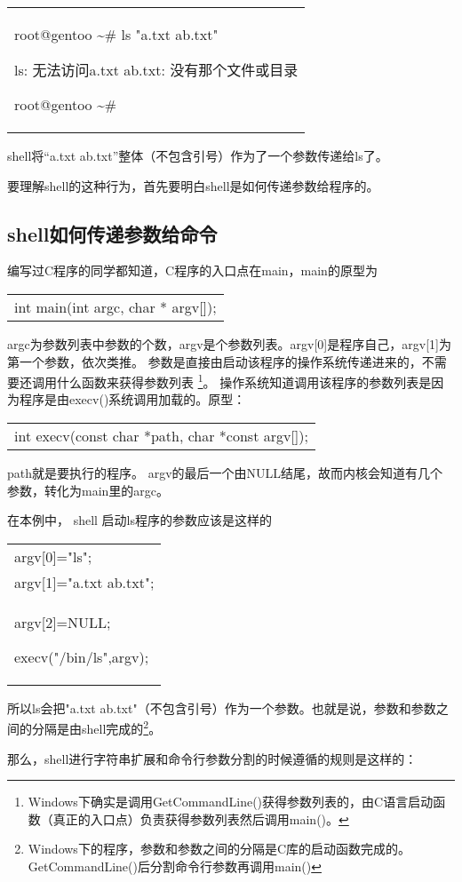 \documentclass[amstex,twoside]{ctexbook}
\newenvironment{insertnote}{ \ttfamily\CJKfamily{KaiTi} }{\vskip 0.5cm }
\newenvironment{code}{\small\tt\begin{longtable}{p{0.8\textwidth}}}{\end{longtable}}
\begin{document}
\begin{code}
root@gentoo \textasciitilde \# ls "a.txt ab.txt" 

ls: 无法访问a.txt ab.txt: 没有那个文件或目录 

root@gentoo \textasciitilde \# 
\end{code}

shell将“a.txt ab.txt”整体（不包含引号）作为了一个参数传递给ls了。

要理解shell的这种行为，首先要明白shell是如何传递参数给程序的。

\begin{insertnote}
\subsection*{shell如何传递参数给命令}

编写过C程序的同学都知道，C程序的入口点在main，main的原型为

\begin{code}
int main(int argc, char * argv[]);
\end{code}

argc为参数列表中参数的个数，argv是个参数列表。argv[0]是程序自己，argv[1]为第一个参数，依次类推。
参数是直接由启动该程序的操作系统传递进来的，不需要还调用什么函数来获得参数列表
\footnote{Windows下确实是调用GetCommandLine()获得参数列表的，由C语言启动函数（真正的入口点）负责获得参数列表然后调用main()。}。
操作系统知道调用该程序的参数列表是因为程序是由execv()系统调用加载的。原型：
\begin{code}
int execv(const char *path, char *const argv[]);
\end{code}
path就是要执行的程序。
argv的最后一个由NULL结尾，故而内核会知道有几个参数，转化为main里的argc。

\end{insertnote}

在本例中，
shell
启动ls程序的参数应该是这样的
\begin{code}
argv[0]="ls";\\
argv[1]="a.txt ab.txt";\\
argv[2]=NULL;

execv("/bin/ls",argv);
\end{code}

所以ls会把"a.txt ab.txt"（不包含引号）作为一个参数。也就是说，参数和参数之间的分隔是由shell完成的\footnote{Windows下的程序，参数和参数之间的分隔是C库的启动函数完成的。GetCommandLine()后分割命令行参数再调用main()}。


那么，shell进行字符串扩展和命令行参数分割的时候遵循的规则是这样的：
\end{document}
